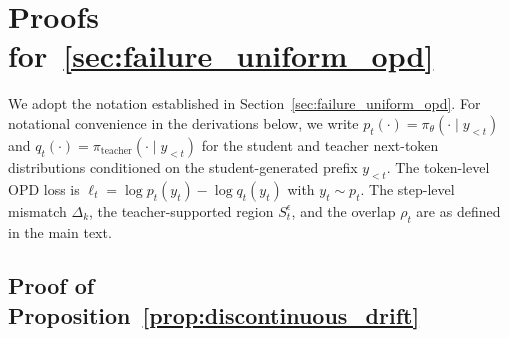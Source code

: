 \section{Proofs for~\cref{sec:failure_uniform_opd}}
\label{app:proof_opd_failure}



We adopt the notation established in Section~\ref{sec:failure_uniform_opd}. For notational convenience in the derivations below, we write $p_t(\cdot) = \pi_\theta(\cdot \mid y_{<t})$ and $q_t(\cdot) = \pi_{\mathrm{teacher}}(\cdot \mid y_{<t})$ for the student and teacher next-token distributions conditioned on the student-generated prefix $y_{<t}$. The token-level OPD loss is $\ell_t = \log p_t(y_t) - \log q_t(y_t)$ with $y_t \sim p_t$. The step-level mismatch $\Delta_k$, the teacher-supported region $S_t^\epsilon$, and the overlap $\rho_t$ are as defined in the main text.

\subsection{Proof of Proposition~\ref{prop:discontinuous_drift}}

